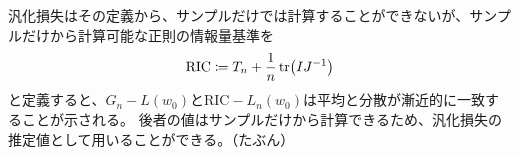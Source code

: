 \documentclass[dvipdfmx]{jsarticle}
\begin{document}
\begin{mybox}[サンプルだけから汎化損失を推定する]
    汎化損失はその定義から、サンプルだけでは計算することができないが、サンプルだけから計算可能な正則の情報量基準を
    \begin{equation}
        \text{RIC} \coloneqq T_n + \frac{1}{n}\tr(IJ^{-1})
    \end{equation}
    と定義すると、$G_n - L(w_0)$と$\text{RIC} - L_n(w_0)$は平均と分散が漸近的に一致することが示される。
    後者の値はサンプルだけから計算できるため、汎化損失の推定値として用いることができる。（たぶん）
\end{mybox}
\end{document}
